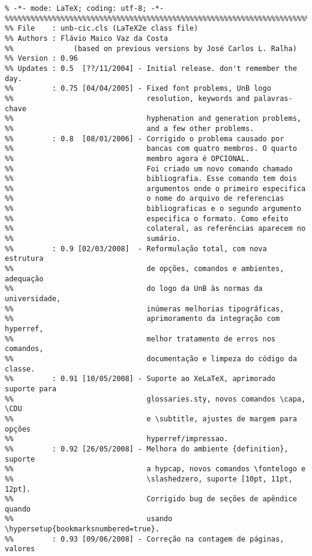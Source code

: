 \small\begin{verbatim}
% -*- mode: LaTeX; coding: utf-8; -*-
%%%%%%%%%%%%%%%%%%%%%%%%%%%%%%%%%%%%%%%%%%%%%%%%%%%%%%%%%%%%%%%%%%%%%%%%%%%%%%%
%% File    : unb-cic.cls (LaTeX2e class file)
%% Authors : Flávio Maico Vaz da Costa
%%              (based on previous versions by José Carlos L. Ralha)
%% Version : 0.96
%% Updates : 0.5  [??/11/2004] - Initial release. don't remember the day.
%%         : 0.75 [04/04/2005] - Fixed font problems, UnB logo
%%                               resolution, keywords and palavras-chave
%%                               hyphenation and generation problems,
%%                               and a few other problems.
%%         : 0.8  [08/01/2006] - Corrigido o problema causado por
%%                               bancas com quatro membros. O quarto
%%                               membro agora é OPCIONAL.
%%                               Foi criado um novo comando chamado
%%                               bibliografia. Esse comando tem dois
%%                               argumentos onde o primeiro especifica
%%                               o nome do arquivo de referencias
%%                               bibliograficas e o segundo argumento
%%                               especifica o formato. Como efeito
%%                               colateral, as referências aparecem no
%%                               sumário.
%%         : 0.9 [02/03/2008]  - Reformulação total, com nova estrutura
%%                               de opções, comandos e ambientes, adequação
%%                               do logo da UnB às normas da universidade,
%%                               inúmeras melhorias tipográficas,
%%                               aprimoramento da integração com hyperref,
%%                               melhor tratamento de erros nos comandos,
%%                               documentação e limpeza do código da classe.
%%         : 0.91 [10/05/2008] - Suporte ao XeLaTeX, aprimorado suporte para
%%                               glossaries.sty, novos comandos \capa, \CDU
%%                               e \subtitle, ajustes de margem para opções
%%                               hyperref/impressao.
%%         : 0.92 [26/05/2008] - Melhora do ambiente {definition}, suporte
%%                               a hypcap, novos comandos \fontelogo e
%%                               \slashedzero, suporte [10pt, 11pt, 12pt].
%%                               Corrigido bug de seções de apêndice quando
%%                               usando \hypersetup{bookmarksnumbered=true}.
%%         : 0.93 [09/06/2008] - Correção na contagem de páginas, valores

\end{verbatim}
